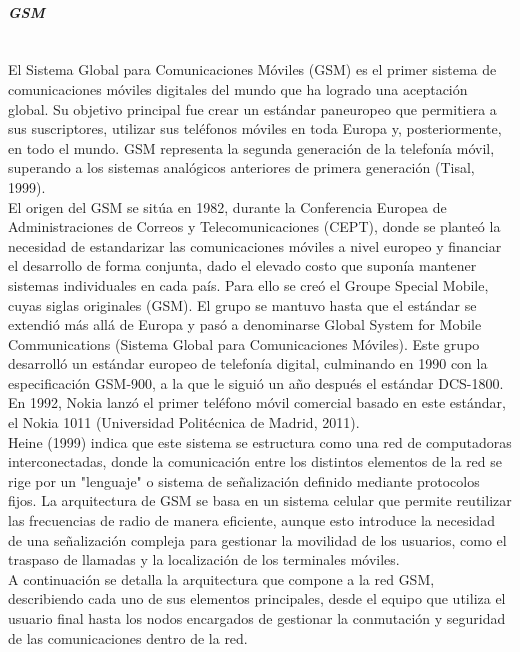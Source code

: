\documentclass[12pt,a4paper]{article}
\begin{document}
	\paragraph*{\textbf{\textit{GSM}}} \mbox{}\\
	
	El Sistema Global para Comunicaciones Móviles (GSM) es el primer sistema de comunicaciones móviles digitales del mundo que ha logrado una aceptación global. Su objetivo principal fue crear un estándar paneuropeo que permitiera a sus suscriptores, utilizar sus teléfonos móviles en toda Europa y, posteriormente, en todo el mundo. GSM representa la segunda generación de la telefonía móvil, superando a los sistemas analógicos anteriores de primera generación (Tisal, 1999). \\
	
	El origen del GSM se sitúa en 1982, durante la Conferencia Europea de Administraciones de Correos y Telecomunicaciones (CEPT), donde se planteó la necesidad de estandarizar las comunicaciones móviles a nivel europeo y financiar el desarrollo de forma conjunta, dado el elevado costo que suponía mantener sistemas individuales en cada país. Para ello se creó el Groupe Special Mobile, cuyas siglas originales (GSM). El grupo se mantuvo hasta que el estándar se extendió más allá de Europa y pasó a denominarse Global System for Mobile Communications (Sistema Global para Comunicaciones Móviles). Este grupo desarrolló un estándar europeo de telefonía digital, culminando en 1990 con la especificación GSM-900, a la que le siguió un año después el estándar DCS-1800. En 1992, Nokia lanzó el primer teléfono móvil comercial basado en este estándar, el Nokia 1011 (Universidad Politécnica de Madrid, 2011). \\
	
	Heine (1999) indica que este sistema se estructura como una red de computadoras interconectadas, donde la comunicación entre los distintos elementos de la red se rige por un "lenguaje" o sistema de señalización definido mediante protocolos fijos. La arquitectura de GSM se basa en un sistema celular que permite reutilizar las frecuencias de radio de manera eficiente, aunque esto introduce la necesidad de una señalización compleja para gestionar la movilidad de los usuarios, como el traspaso de llamadas y la localización de los terminales móviles. \\
	
	A continuación se detalla la arquitectura que compone a la red GSM, describiendo cada uno de sus elementos principales, desde el equipo que utiliza el usuario final hasta los nodos encargados de gestionar la conmutación y seguridad de las comunicaciones dentro de la red. \\
	
\end{document}
